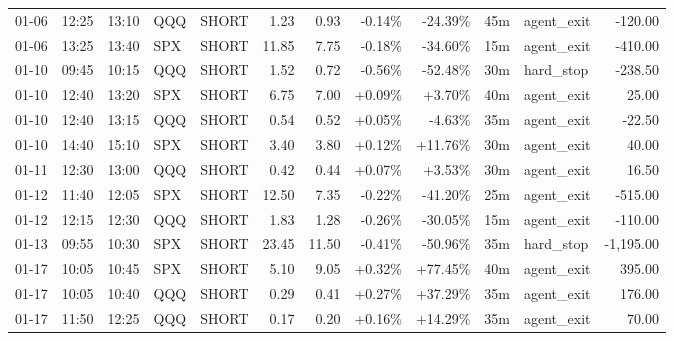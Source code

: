 \documentclass[11pt,a4paper,twoside]{article}
\begin{document}
\begin{center}
\begin{longtable}{>{\color{txtmain}}l l l l l r r r r r >{\color{txtmain}}l r}
01-06 & 12:25 & 13:10 & QQQ & SHORT & 1.23 & 0.93 & \textcolor{lossred}{-0.14\%} & \textcolor{lossred}{-24.39\%} & 45m & agent\_exit & \textcolor{lossred}{-120.00} \\
01-06 & 13:25 & 13:40 & SPX & SHORT & 11.85 & 7.75 & \textcolor{lossred}{-0.18\%} & \textcolor{lossred}{-34.60\%} & 15m & agent\_exit & \textcolor{lossred}{-410.00} \\
01-10 & 09:45 & 10:15 & QQQ & SHORT & 1.52 & 0.72 & \textcolor{lossred}{-0.56\%} & \textcolor{lossred}{-52.48\%} & 30m & hard\_stop & \textcolor{lossred}{-238.50} \\
01-10 & 12:40 & 13:20 & SPX & SHORT & 6.75 & 7.00 & \textcolor{wingreen}{+0.09\%} & \textcolor{wingreen}{+3.70\%} & 40m & agent\_exit & \textcolor{wingreen}{25.00} \\
01-10 & 12:40 & 13:15 & QQQ & SHORT & 0.54 & 0.52 & \textcolor{wingreen}{+0.05\%} & \textcolor{lossred}{-4.63\%} & 35m & agent\_exit & \textcolor{lossred}{-22.50} \\
01-10 & 14:40 & 15:10 & SPX & SHORT & 3.40 & 3.80 & \textcolor{wingreen}{+0.12\%} & \textcolor{wingreen}{+11.76\%} & 30m & agent\_exit & \textcolor{wingreen}{40.00} \\
01-11 & 12:30 & 13:00 & QQQ & SHORT & 0.42 & 0.44 & \textcolor{wingreen}{+0.07\%} & \textcolor{wingreen}{+3.53\%} & 30m & agent\_exit & \textcolor{wingreen}{16.50} \\
01-12 & 11:40 & 12:05 & SPX & SHORT & 12.50 & 7.35 & \textcolor{lossred}{-0.22\%} & \textcolor{lossred}{-41.20\%} & 25m & agent\_exit & \textcolor{lossred}{-515.00} \\
01-12 & 12:15 & 12:30 & QQQ & SHORT & 1.83 & 1.28 & \textcolor{lossred}{-0.26\%} & \textcolor{lossred}{-30.05\%} & 15m & agent\_exit & \textcolor{lossred}{-110.00} \\
01-13 & 09:55 & 10:30 & SPX & SHORT & 23.45 & 11.50 & \textcolor{lossred}{-0.41\%} & \textcolor{lossred}{-50.96\%} & 35m & hard\_stop & \textcolor{lossred}{-1,195.00} \\
01-17 & 10:05 & 10:45 & SPX & SHORT & 5.10 & 9.05 & \textcolor{wingreen}{+0.32\%} & \textcolor{wingreen}{+77.45\%} & 40m & agent\_exit & \textcolor{wingreen}{395.00} \\
01-17 & 10:05 & 10:40 & QQQ & SHORT & 0.29 & 0.41 & \textcolor{wingreen}{+0.27\%} & \textcolor{wingreen}{+37.29\%} & 35m & agent\_exit & \textcolor{wingreen}{176.00} \\
01-17 & 11:50 & 12:25 & QQQ & SHORT & 0.17 & 0.20 & \textcolor{wingreen}{+0.16\%} & \textcolor{wingreen}{+14.29\%} & 35m & agent\_exit & \textcolor{wingreen}{70.00} \\

\end{longtable}
\end{center}
\end{document}
